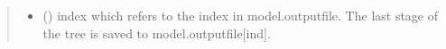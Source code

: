 \documentclass[letterpaper,10pt,english]{sphinxmanual}
\begin{document}
\begin{fulllineitems}
\begin{fulllineitems}
\begin{quote}
\begin{description}
\begin{itemize}
\item {} 
 () \textendash{} index which refers to the index in model.outputfile.
The last stage of the tree is saved to model.outputfile{[}ind{]}.

\end{itemize}

\end{description}\end{quote}

\end{fulllineitems}


\end{fulllineitems}

\label{\detokenize{index:module-src.tree}}
\end{document}
